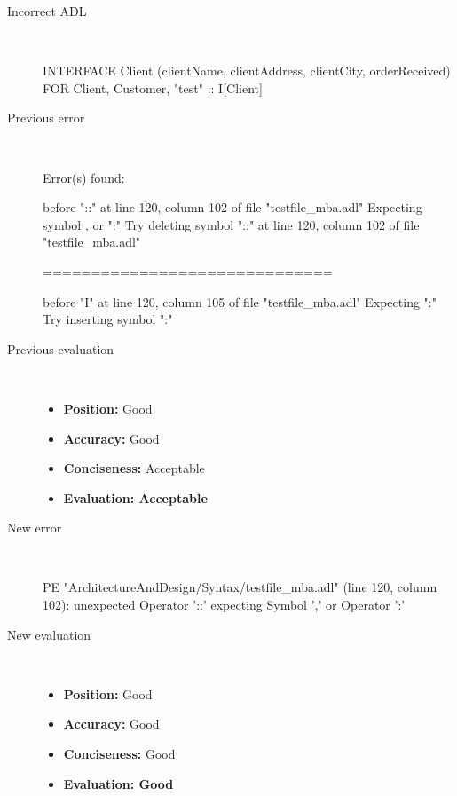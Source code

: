 \begin{description}
  \item[Incorrect ADL]~\\
\begin{adl}
INTERFACE Client (clientName, clientAddress, clientCity, orderReceived) FOR Client, Customer, "test" :: I[Client]\end{adl}
  \item[Previous error]~\\
\begin{haskell}
Error(s) found:

before "::" at line 120, column 102 of file "testfile_mba.adl"
Expecting symbol , or ":"
Try deleting symbol "::" at line 120, column 102 of file "testfile_mba.adl"

==============================

before "I" at line 120, column 105 of file "testfile_mba.adl"
Expecting ":"
Try inserting symbol ":"

\end{haskell}
  \item[Previous evaluation]~\\
    \begin{itemize}
    \item \textbf{Position:} Good
    \item \textbf{Accuracy:} Good
    \item \textbf{Conciseness:} Acceptable
    \item \textbf{Evaluation: Acceptable}
    \end{itemize}
  \item[New error]~\\
\begin{haskell}
PE "ArchitectureAndDesign/Syntax/testfile_mba.adl" (line 120, column 102):
unexpected Operator '::'
expecting Symbol ',' or Operator ':'
\end{haskell}
  \item[New evaluation]~\\
    \begin{itemize}
    \item \textbf{Position:} Good
    \item \textbf{Accuracy:} Good
    \item \textbf{Conciseness:} Good
    \item \textbf{Evaluation: Good}
    \end{itemize}
  \end{description}

\hrulefill

